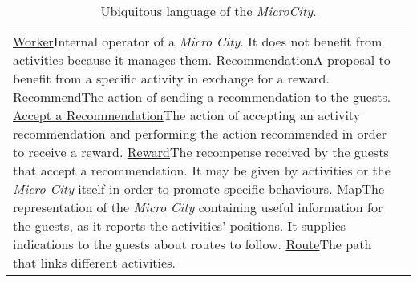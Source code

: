 \begin{table}[H]
\begin{tabular}{|l|p{}|}
        \ul{Worker}{Internal operator of a \textit{Micro City}. It does not benefit from activities because it manages them.}
        \ul{Recommendation}{A proposal to benefit from a specific activity in exchange for a reward.}
        \ul{Recommend}{The action of sending a recommendation to the guests.}
        \ul{Accept a Recommendation}{The action of accepting an activity recommendation and performing the action recommended in order to receive a reward.}
        \ul{Reward}{The recompense received by the guests that accept a recommendation. It may be given by activities or the \textit{Micro City} itself in order to promote specific behaviours.}
        \ul{Map}{The representation of the \textit{Micro City} containing useful information for the guests, as it reports the activities' positions. It supplies indications to the guests about routes to follow.}
        \ul{Route}{The path that links different activities.}
    \end{tabular}
    \caption{Ubiquitous language of the \textit{MicroCity}.}
    \label{tab:ul}
\end{table}
